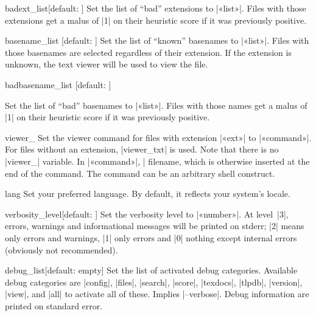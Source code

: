 \documentclass{texdoc-doc}
\begin{document}
\begin{confitem}{badext\_list}{}[default: ]
Set the list of ``bad'' extensions to |«list»|. Files with those extensions get
a malus of |1| on their heuristic score if it was previously positive.
\end{confitem}

\begin{confitem}{basename\_list}
  {}[default: ]
Set the list of ``known'' basenames to |«list»|. Files with those basenames
are selected regardless of their extension. If the extension is unknown, the
text viewer will be used to view the file.
\end{confitem}

\begin{confitem}{badbasename\_list}
  {}[default: ]

Set the list of ``bad'' basenames to |«list»|. Files with those names get a
malus of |1| on their heuristic score if it was previously positive.
\end{confitem}

\begin{confitem}{viewer\_}{}
Set the viewer command for files with extension |«ext»| to |«command»|. For
files without an extension, |viewer_txt| is used. Note that there is no
|viewer_| variable. In |«command»|, |%
filename, which is otherwise inserted at the end of the command. The command
can be an arbitrary shell construct.
\end{confitem}

\begin{confitem}{lang}{}
Set your preferred language. By default, it reflects your system's locale.
\end{confitem}

\begin{confitem}{verbosity\_level}{}[default: ]
Set the verbosity level to |«number»|. At level~|3|, errors, warnings and
informational messages will be printed on stderr; |2| means only errors and
warnings, |1| only errors and |0| nothing except internal errors (obviously not
recommended).
\end{confitem}

\begin{confitem}{debug\_list}{}[default: empty]
Set the list of activated debug categories. Available debug categories are
|config|, |files|, |search|, |score|, |texdocs|, |tlpdb|, |version|, |view|,
and |all| to activate all of these. Implies |--verbose|. Debug information are
printed on standard error.
\end{confitem}
\end{document}
